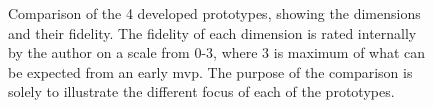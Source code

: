 \documentclass[pdftex,10pt,b5paper,twoside]{report}
\begin{document}
\begin{figure}[h!]%
    \centering
    
    \qquad
    
    \qquad
    
    
    \caption{Comparison of the 4 developed prototypes, showing the dimensions and their fidelity. The fidelity of each dimension is rated internally by the author on a scale from 0-3, where 3 is maximum of what can be expected from an early \gls{mvp}. The purpose of the comparison is solely to illustrate the different focus of each of the prototypes.}
    \label{fig:radar-chart}
\end{figure}
\end{document}
